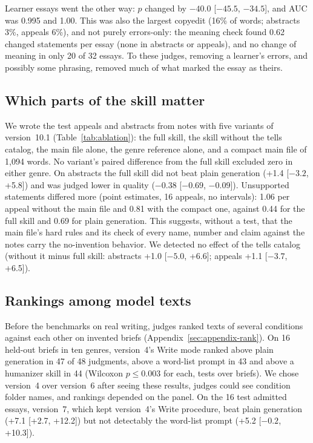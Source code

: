 \documentclass[11pt]{article}
\begin{document}
Learner essays went the other way: $p$ changed by $-40.0$ [$-45.5$, $-34.5$], and AUC was 0.995 and 1.00. This was also the largest copyedit (16\% of words; abstracts 3\%, appeals 6\%), and not purely errors-only: the meaning check found 0.62 changed statements per essay (none in abstracts or appeals), and no change of meaning in only 20 of 32 essays. To these judges, removing a learner's errors, and possibly some phrasing, removed much of what marked the essay as theirs.

\subsection{Which parts of the skill matter}
\label{sec:ablation}

We wrote the test appeals and abstracts from notes with five variants of version~10.1 (Table~\ref{tab:ablation}): the full skill, the skill without the tells catalog, the main file alone, the genre reference alone, and a compact main file of 1,094 words. No variant's paired difference from the full skill excluded zero in either genre. On abstracts the full skill did not beat plain generation (+1.4 [$-3.2$, +5.8]) and was judged lower in quality ($-0.38$ [$-0.69$, $-0.09$]). Unsupported statements differed more (point estimates, 16 appeals, no intervals): 1.06 per appeal without the main file and 0.81 with the compact one, against 0.44 for the full skill and 0.69 for plain generation. This suggests, without a test, that the main file's hard rules and its check of every name, number and claim against the notes carry the no-invention behavior. We detected no effect of the tells catalog (without it minus full skill: abstracts +1.0 [$-5.0$, +6.6]; appeals +1.1 [$-3.7$, +6.5]).

\subsection{Rankings among model texts}
\label{sec:rank}

Before the benchmarks on real writing, judges ranked texts of several conditions against each other on invented briefs (Appendix~\ref{sec:appendix-rank}). On 16 held-out briefs in ten genres, version~4's Write mode ranked above plain generation in 47 of 48 judgments, above a word-list prompt in 43 and above a humanizer skill in 44 (Wilcoxon $p \le 0.003$ for each, tests over briefs). We chose version~4 over version~6 after seeing these results, judges could see condition folder names, and rankings depended on the panel. On the 16 test admitted essays, version~7, which kept version~4's Write procedure, beat plain generation (+7.1 [+2.7, +12.2]) but not detectably the word-list prompt (+5.2 [$-0.2$, +10.3]).
\end{document}
